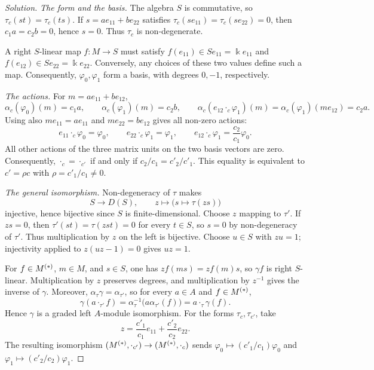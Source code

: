\begin{advanced}
\begin{hidden}
\begin{proof}[Solution]
\emph{The form and the basis.}
The algebra $S$ is commutative, so $\tau_c(st)=\tau_c(ts)$.
If $s=ae_{11}+be_{22}$ satisfies $\tau_c(se_{11})=\tau_c(se_{22})=0$, then $c_1a=c_2b=0$, hence $s=0$.
Thus $\tau_c$ is non-degenerate.

A right $S$-linear map $f:M\to S$ must satisfy $f(e_{11})\in Se_{11}=\Bbbk e_{11}$ and $f(e_{12})\in Se_{22}=\Bbbk e_{22}$.
Conversely, any choices of these two values define such a map.
Consequently, $\varphi_0,\varphi_1$ form a basis, with degrees $0,-1$, respectively.

\emph{The actions.}
For $m=ae_{11}+be_{12}$,
\[
\alpha_c(\varphi_0)(m)=c_1a,\qquad
\alpha_c(\varphi_1)(m)=c_2b,\qquad
\alpha_c(e_{12}\cdot_c\varphi_1)(m)
=\alpha_c(\varphi_1)(me_{12})=c_2a.
\]
Using also $me_{11}=ae_{11}$ and $me_{22}=be_{12}$ gives all non-zero actions:
\[
e_{11}\cdot_c\varphi_0=\varphi_0,\qquad
e_{22}\cdot_c\varphi_1=\varphi_1,\qquad
e_{12}\cdot_c\varphi_1=\frac{c_2}{c_1}\varphi_0.
\]
All other actions of the three matrix units on the two basis vectors are zero.
Consequently, $\cdot_c=\cdot_{c'}$ if and only if $c_2/c_1=c'_2/c'_1$.
This equality is equivalent to $c'=\rho c$ with $\rho=c'_1/c_1\neq0$.

\emph{The general isomorphism.}
Non-degeneracy of $\tau$ makes
\[
S\longrightarrow D(S),\qquad z\longmapsto\bigl(s\mapsto\tau(zs)\bigr)
\]
injective, hence bijective since $S$ is finite-dimensional.
Choose $z$ mapping to $\tau'$.
If $zs=0$, then $\tau'(st)=\tau(zst)=0$ for every $t\in S$, so $s=0$ by non-degeneracy of $\tau'$.
Thus multiplication by $z$ on the left is bijective.
Choose $u\in S$ with $zu=1$; injectivity applied to $z(uz-1)=0$ gives $uz=1$.

For $f\in M^{(*)}$, $m\in M$, and $s\in S$, one has $zf(ms)=zf(m)s$, so $\gamma f$ is right $S$-linear.
Multiplication by $z$ preserves degrees, and multiplication by $z^{-1}$ gives the inverse of $\gamma$.
Moreover, $\alpha_\tau\gamma=\alpha_{\tau'}$, so for every $a\in A$ and $f\in M^{(*)}$,
\[
\gamma(a\cdot_{\tau'}f)
=\alpha_\tau^{-1}\bigl(a\alpha_{\tau'}(f)\bigr)
=a\cdot_\tau\gamma(f).
\]
Hence $\gamma$ is a graded left $A$-module isomorphism.
For the forms $\tau_c,\tau_{c'}$, take
\[
z=\frac{c'_1}{c_1}e_{11}+\frac{c'_2}{c_2}e_{22}.
\]
The resulting isomorphism $(M^{(*)},\cdot_{c'})\to(M^{(*)},\cdot_c)$ sends
$\varphi_0\mapsto(c'_1/c_1)\varphi_0$ and $\varphi_1\mapsto(c'_2/c_2)\varphi_1$.
\end{proof}
\end{hidden}
\end{advanced}

\pagebreak

